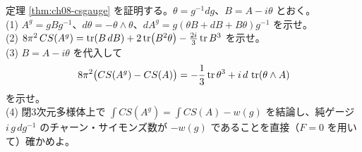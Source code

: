 \begin{problem}[難易度 D]\label{ch08-prob-csgauge}
定理 \ref{thm:ch08-csgauge} を証明する。$\theta=g^{-1}dg$、$B=A-i\theta$ とおく。\\
(1) $A^g=gBg^{-1}$、$d\theta=-\theta\wedge\theta$、$dA^g=g(\theta B+dB+B\theta)g^{-1}$ を示せ。\\
(2) $8\pi^2\,CS(A^g)=\tr(B\,dB)+2\tr(B^2\theta)-\frac{2i}{3}\tr B^3$ を示せ。\\
(3) $B=A-i\theta$ を代入して
\[
8\pi^2\bigl(CS(A^g)-CS(A)\bigr)=-\frac13\tr\theta^3+i\,d\,\tr(\theta\wedge A)
\]
を示せ。\\
(4) 閉3次元多様体上で $\int CS(A^g)=\int CS(A)-w(g)$ を結論し、純ゲージ $i\,g\,dg^{-1}$ のチャーン・サイモンズ数が $-w(g)$ であることを直接（$F=0$ を用いて）確かめよ。
\end{problem}

